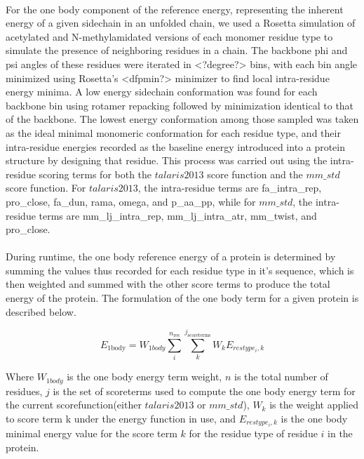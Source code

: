 \paragraph{}
For the one body component of the reference energy, representing the inherent energy of a given sidechain in an unfolded chain, we used a Rosetta simulation of acetylated and N-methylamidated versions of each monomer residue type to simulate the presence of neighboring residues in a chain. The backbone phi and psi angles of these residues were iterated in <?degree?> bins, with each bin angle minimized using Rosetta's <dfpmin?> minimizer to find local intra-residue energy minima. A low energy sidechain conformation was found for each backbone bin using rotamer repacking followed by minimization identical to that of the backbone. The lowest energy conformation among those sampled was taken as the ideal minimal monomeric conformation for each residue type, and their intra-residue energies recorded as the baseline energy introduced into a protein structure by designing that residue. This process was carried out using the intra-residue scoring terms for both the $talaris2013$ score function and the $mm\_std$ score function. For $talaris2013$, the intra-residue terms are fa\_intra\_rep, pro\_close, fa\_dun, rama, omega, and p\_aa\_pp, while for $mm\_std$, the intra-residue terms are mm\_lj\_intra\_rep, mm\_lj\_intra\_atr, mm\_twist, and pro\_close.

\paragraph{}
During runtime, the one body reference energy of a protein is determined by summing the values thus recorded for each residue type in it's sequence, which is then weighted and summed with the other score terms to produce the total energy of the protein. The formulation of the one body term for a given protein is described below.

\begin{equation}
E_{\text{1body}} = W_{1body} \sum_{i}^{n_{\text{res}}} \sum_{k}^{j_{\text{scoreterms}}} W_{k} E_{restype_{i},k}
\end{equation}

Where $W_{1body}$ is the one body energy term weight, $n$ is the total number of residues, $j$ is the set of scoreterms used to compute the one body energy term for the current scorefunction(either $talaris2013$ or $mm\_std$), $W_{k}$ is the weight applied to score term k under the energy function in use, and $E_{restype_{i},k}$ is the one body minimal energy value for the score term $k$ for the residue type of residue $i$ in the protein.


